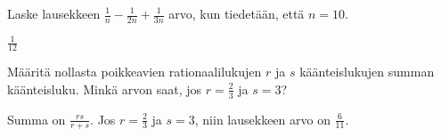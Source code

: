 \begin{tehtavasivu}
\begin{tehtava}
	Laske lausekkeen $\frac{1}{n}-\frac{1}{2n}+\frac{1}{3n}$ arvo, kun tiedetään, että $n = 10$.
	\begin{vastaus}
		$\frac{1}{12}$
	\end{vastaus}
\end{tehtava}
\begin{tehtava}
	Määritä nollasta poikkeavien rationaalilukujen \(r\) ja \(s\) käänteislukujen summan käänteisluku. Minkä arvon saat, jos \(r=\frac{2}{3}\) ja \(s=3\)?
	\begin{vastaus}
		Summa on $\frac{rs}{r+s}$. Jos \(r=\frac{2}{3}\) ja \(s=3\), niin lausekkeen arvo on \(\frac{6}{11}\).
	\end{vastaus}
\end{tehtava}



\begin{tehtava}
	\begin{alakohdat}
	\end{alakohdat}
	\begin{vastaus}
		\begin{alakohdat}
			\alakohta{$\frac{1}{n(n+1)}$}
			\alakohta{$1-\frac{1}{n}$}
		\end{alakohdat}
	\end{vastaus}
\end{tehtava}


\end{tehtavasivu}
